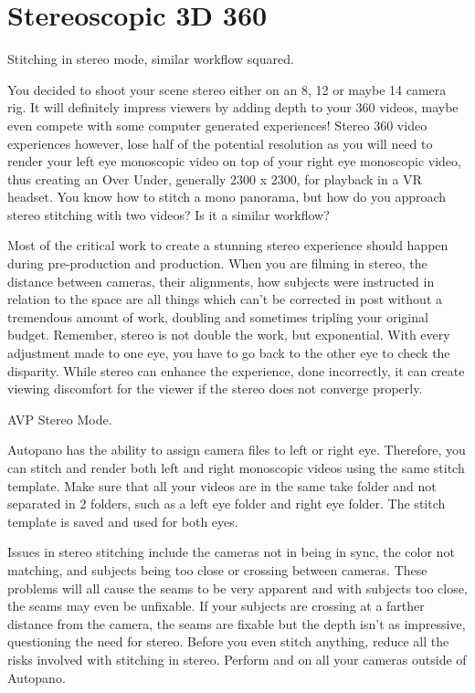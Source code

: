 \chapter{Stereoscopic 3D 360}
\pagecolor{white}
\label{chap:42}
\begin{fullwidth}

\problem

{\large Stitching in stereo mode, similar workflow squared. \par}

You decided to shoot your scene stereo either on an 8, 12 or maybe 14 camera rig. It will definitely impress viewers by adding depth to your 360 videos, maybe even compete with some computer generated experiences! Stereo 360 video experiences however, lose half of the potential resolution as you will need to render your left eye monoscopic video on top of your right eye monoscopic video, thus creating an Over Under, generally 2300 x 2300, for playback in a VR headset. You know how to stitch a mono panorama, but how do you approach stereo stitching with two videos? Is it a similar workflow?

\solution

Most of the critical work to create a stunning stereo experience should happen during pre-production and production. When you are filming in stereo, the distance between cameras, their alignments, how subjects were instructed in relation to the space are all things which can’t be corrected in post without a tremendous amount of work, doubling and sometimes tripling your original budget. Remember, stereo is not double the work, but exponential. With every adjustment made to one eye, you have to go back to the other eye to check the disparity. While stereo can enhance the experience, done incorrectly, it can create viewing discomfort for the viewer if the stereo does not converge properly. 


{\large AVP Stereo Mode. \par}

Autopano has the ability to assign camera files to left or right eye. Therefore, you can stitch and render both left and right monoscopic videos using the same stitch template. Make sure that all your videos are in the same take folder and not separated in 2 folders, such as a left eye folder and right eye folder. The stitch template is saved and used for both eyes. 


Issues in stereo stitching include the cameras not in being in sync, the color not matching, and subjects being too close or crossing between cameras. These problems will all cause the seams to be very apparent and with subjects too close, the seams may even be unfixable. If your subjects are crossing at a farther distance from the camera, the seams are fixable but the depth isn’t as impressive, questioning the need for stereo. Before you even stitch anything, reduce all the risks involved with stitching in stereo. Perform \textbf{} and \textbf{} on all your cameras outside of Autopano.


\end{fullwidth}
